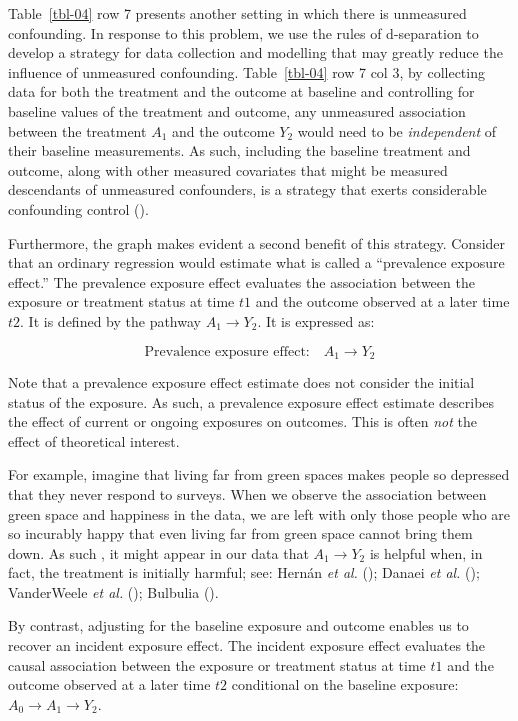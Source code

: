 \documentclass[
  singlecolumn]{article}
\begin{document}
Table~\ref{tbl-04} row 7 presents another setting in which there is
unmeasured confounding. In response to this problem, we use the rules of
d-separation to develop a strategy for data collection and modelling
that may greatly reduce the influence of unmeasured confounding.
Table~\ref{tbl-04} row 7 col 3, by collecting data for both the
treatment and the outcome at baseline and controlling for baseline
values of the treatment and outcome, any unmeasured association between
the treatment \(A_1\) and the outcome \(Y_2\) would need to be
\emph{independent} of their baseline measurements. As such, including
the baseline treatment and outcome, along with other measured covariates
that might be measured descendants of unmeasured confounders, is a
strategy that exerts considerable confounding control
().

Furthermore, the graph makes evident a second benefit of this strategy.
Consider that an ordinary regression would estimate what is called a
``prevalence exposure effect.'' The prevalence exposure effect evaluates
the association between the exposure or treatment status at time \(t1\)
and the outcome observed at a later time \(t2\). It is defined by the
pathway \(A_{1} \to Y_{2}\). It is expressed as:

\[
\text{Prevalence exposure effect:} \quad A_{1} \to Y_{2}
\]

Note that a prevalence exposure effect estimate does not consider the
initial status of the exposure. As such, a prevalence exposure effect
estimate describes the effect of current or ongoing exposures on
outcomes. This is often \emph{not} the effect of theoretical interest.

For example, imagine that living far from green spaces makes people so
depressed that they never respond to surveys. When we observe the
association between green space and happiness in the data, we are left
with only those people who are so incurably happy that even living far
from green space cannot bring them down. As such , it might appear in
our data that \(A_{1} \to Y_{2}\) is helpful when, in fact, the
treatment is initially harmful; see: Hernán \emph{et al.}
(); Danaei \emph{et al.}
(); VanderWeele \emph{et al.}
(); Bulbulia
().

By contrast, adjusting for the baseline exposure and outcome enables us
to recover an incident exposure effect. The incident exposure effect
evaluates the causal association between the exposure or treatment
status at time \(t1\) and the outcome observed at a later time \(t2\)
conditional on the baseline exposure: \(A_{0} \to A_{1} \to Y_{2}\).
\end{document}
